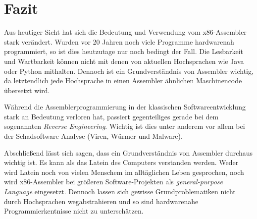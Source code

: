 \section{Fazit}
Aus heutiger Sicht hat sich die Bedeutung und Verwendung vom x86-Assembler stark verändert.
Wurden vor 20 Jahren noch viele Programme hardwarenah programmiert, so ist dies heutzutage nur noch bedingt der Fall.
Die Lesbarkeit und Wartbarkeit können nicht mit denen von aktuellen Hochsprachen wie Java oder Python mithalten.
Dennoch ist ein Grundverständnis von Assembler wichtig, da letztendlich jede Hochsprache in einen Assembler ähnlichen Maschinencode übersetzt wird.

Während die Assemblerprogrammierung in der klassischen Softwareentwicklung stark an Bedeutung verloren hat, passiert gegenteiliges gerade bei dem sogenannten \textit{Reverse Engineering}.
Wichtig ist dies unter anderem vor allem bei der Schadsoftware-Analyse (Viren, Würmer und Malware).

Abschließend lässt sich sagen, dass ein Grundverständnis von Assembler durchaus wichtig ist.
Es kann als das Latein des Computers verstanden werden.
Weder wird Latein noch von vielen Menschem im alltäglichen Leben gesprochen, noch wird x86-Assembler bei größeren Software-Projekten als \textit{general-purpose Language} eingesetzt.
Dennoch lassen sich gewisse Grundproblematiken nicht durch Hochsprachen wegabstrahieren und so sind hardwarenahe Programmierkentnisse nicht zu unterschätzen.
